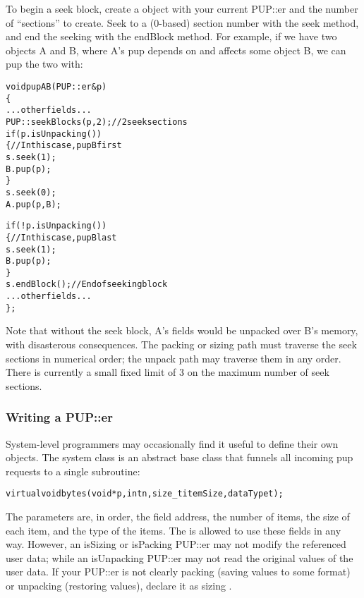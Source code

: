 To begin a seek block, create a  object
with your current PUP::er and the number of ``sections'' to 
create.  Seek to a (0-based) section number
with the seek method, and end the seeking with the endBlock method.
For example, if we have two objects A and B, where A's pup
depends on and affects some object B, we can pup the two with:

\begin{alltt}
void pupAB(PUP::er &p)
\{
  ... other fields ...
  PUP::seekBlock s(p,2); //2 seek sections
  if (p.isUnpacking()) 
  \{//In this case, pup B first
    s.seek(1);
    B.pup(p);
  \}
  s.seek(0);
  A.pup(p,B);
  
  if (!p.isUnpacking()) 
  \{//In this case, pup B last
    s.seek(1);
    B.pup(p);
  \}
  s.endBlock(); //End of seeking block
  ... other fields ...
\};
\end{alltt}

Note that without the seek block, A's fields would be unpacked
over B's memory, with disasterous consequences.
The packing or sizing path must traverse the seek sections
in numerical order; the unpack path may traverse them in any
order.  There is currently a small fixed limit of 3 on the 
maximum number of seek sections.


\subsubsection{Writing a PUP::er}
System-level programmers may occasionally find it useful to define
their own  objects.  The system  class is 
an abstract base class that funnels all incoming pup requests
to a single subroutine:

\begin{alltt}
    virtual void bytes(void *p,int n,size\_t itemSize,dataType t);
\end{alltt}

The parameters are, in order, the field address, the number of items,
the size of each item, and the type of the items. The 
is allowed to use these fields in any way.  However, an isSizing
or isPacking PUP::er may not modify the referenced user data; 
while an isUnpacking PUP::er may not read the original values of 
the user data.  If your PUP::er is not clearly packing (saving values
to some format) or unpacking (restoring values), declare it as 
sizing .



